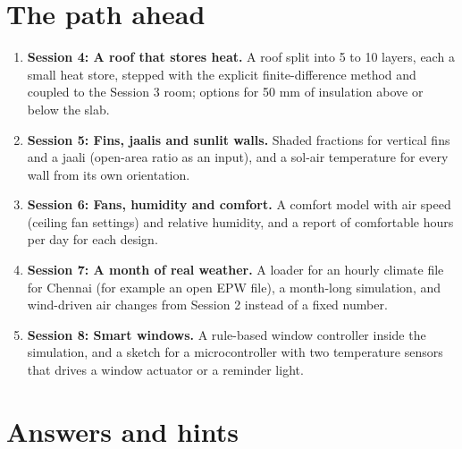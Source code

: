 \documentclass[11pt,a4paper]{article}
\begin{document}
\section{The path ahead}
\begin{enumerate}[nosep]
\item \textbf{Session 4: A roof that stores heat.} A roof split into 5 to 10 layers, each a small heat store, stepped with the explicit finite-difference method and coupled to the Session 3 room; options for 50 mm of insulation above or below the slab.
\item \textbf{Session 5: Fins, jaalis and sunlit walls.} Shaded fractions for vertical fins and a jaali (open-area ratio as an input), and a sol-air temperature for every wall from its own orientation.
\item \textbf{Session 6: Fans, humidity and comfort.} A comfort model with air speed (ceiling fan settings) and relative humidity, and a report of comfortable hours per day for each design.
\item \textbf{Session 7: A month of real weather.} A loader for an hourly climate file for Chennai (for example an open EPW file), a month-long simulation, and wind-driven air changes from Session 2 instead of a fixed number.
\item \textbf{Session 8: Smart windows.} A rule-based window controller inside the simulation, and a sketch for a microcontroller with two temperature sensors that drives a window actuator or a reminder light.
\end{enumerate}

\section{Answers and hints}
\end{document}
